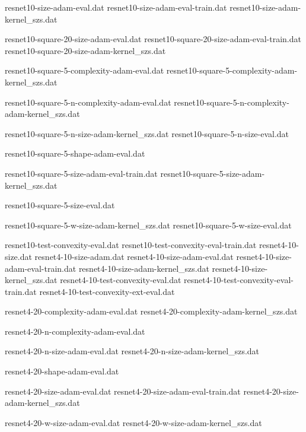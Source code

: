 

resnet10-size-adam-eval.dat
resnet10-size-adam-eval-train.dat
resnet10-size-adam-kernel_szs.dat

resnet10-square-20-size-adam-eval.dat
resnet10-square-20-size-adam-eval-train.dat
resnet10-square-20-size-adam-kernel_szs.dat

resnet10-square-5-complexity-adam-eval.dat
resnet10-square-5-complexity-adam-kernel_szs.dat

resnet10-square-5-n-complexity-adam-eval.dat
resnet10-square-5-n-complexity-adam-kernel_szs.dat

resnet10-square-5-n-size-adam-kernel_szs.dat
resnet10-square-5-n-size-eval.dat

resnet10-square-5-shape-adam-eval.dat

resnet10-square-5-size-adam-eval-train.dat
resnet10-square-5-size-adam-kernel_szs.dat

resnet10-square-5-size-eval.dat

resnet10-square-5-w-size-adam-kernel_szs.dat
resnet10-square-5-w-size-eval.dat

%
resnet10-test-convexity-eval.dat
resnet10-test-convexity-eval-train.dat
resnet4-10-size.dat
resnet4-10-size-adam.dat
resnet4-10-size-adam-eval.dat
resnet4-10-size-adam-eval-train.dat
resnet4-10-size-adam-kernel_szs.dat
resnet4-10-size-kernel_szs.dat
resnet4-10-test-convexity-eval.dat
resnet4-10-test-convexity-eval-train.dat
resnet4-10-test-convexity-ext-eval.dat

resnet4-20-complexity-adam-eval.dat
resnet4-20-complexity-adam-kernel_szs.dat

resnet4-20-n-complexity-adam-eval.dat

resnet4-20-n-size-adam-eval.dat
resnet4-20-n-size-adam-kernel_szs.dat

resnet4-20-shape-adam-eval.dat

resnet4-20-size-adam-eval.dat
resnet4-20-size-adam-eval-train.dat
resnet4-20-size-adam-kernel_szs.dat

resnet4-20-w-size-adam-eval.dat
resnet4-20-w-size-adam-kernel_szs.dat

